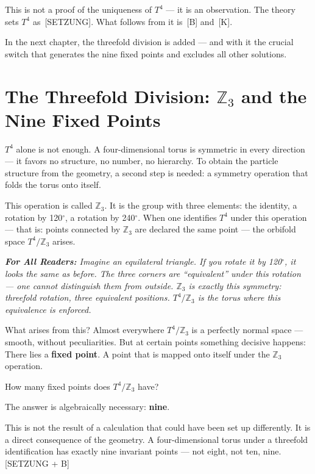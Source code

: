 \documentclass[11pt,oneside]{book}
\newcommand{\status}[1]{\penalty10000\,{\scriptsize\textcolor{gray!60}{[#1]}}}
\newenvironment{laierspur}{%
  \par\vspace{4pt}%
  \noindent\small\itshape\color{blue!60!black}%
  \textbf{For All Readers:}\enspace\ignorespaces}{%
  \par\vspace{4pt}\normalsize\normalfont\normalcolor}
\begin{document}
This is not a proof of the uniqueness of $T^4$ — it is an observation. The
theory sets $T^4$ as \status{SETZUNG}. What follows from it is \status{B} and \status{K}.

In the next chapter, the threefold division is added — and with it the
crucial switch that generates the nine fixed points and excludes all other
solutions.


\chapter{\texorpdfstring{The Threefold Division: $\mathbb{Z}_3$ and the Nine Fixed Points}{The Threefold Division: Z3 and the Nine Fixed Points}}

$T^4$ alone is not enough. A four-dimensional torus is symmetric in every
direction — it favors no structure, no number, no hierarchy. To obtain the
particle structure from the geometry, a second step is needed: a symmetry
operation that folds the torus onto itself.

This operation is called $\mathbb{Z}_3$. It is the group with three elements: the
identity, a rotation by 120$^\circ$, a rotation by 240$^\circ$. When one identifies $T^4$
under this operation — that is: points connected by $\mathbb{Z}_3$ are declared the
same point — the orbifold space $T^4/\mathbb{Z}_3$ arises.

\begin{laierspur}
Imagine an equilateral triangle. If you rotate it by 120$^\circ$, it looks
the same as before. The three corners are \enquote{equivalent} under this rotation —
one cannot distinguish them from outside. $\mathbb{Z}_3$ is exactly this symmetry:
threefold rotation, three equivalent positions. $T^4/\mathbb{Z}_3$ is the torus where
this equivalence is enforced.
\end{laierspur}

What arises from this? Almost everywhere $T^4/\mathbb{Z}_3$ is a perfectly normal
space — smooth, without peculiarities. But at certain points something
decisive happens: There lies a \textbf{fixed point}. A point that is mapped onto
itself under the $\mathbb{Z}_3$ operation.

How many fixed points does $T^4/\mathbb{Z}_3$ have?

The answer is algebraically necessary: \textbf{nine}.

This is not the result of a calculation that could have been set up
differently. It is a direct consequence of the geometry. A four-dimensional
torus under a threefold identification has exactly nine invariant points —
not eight, not ten, nine. [SETZUNG + B]
\end{document}
